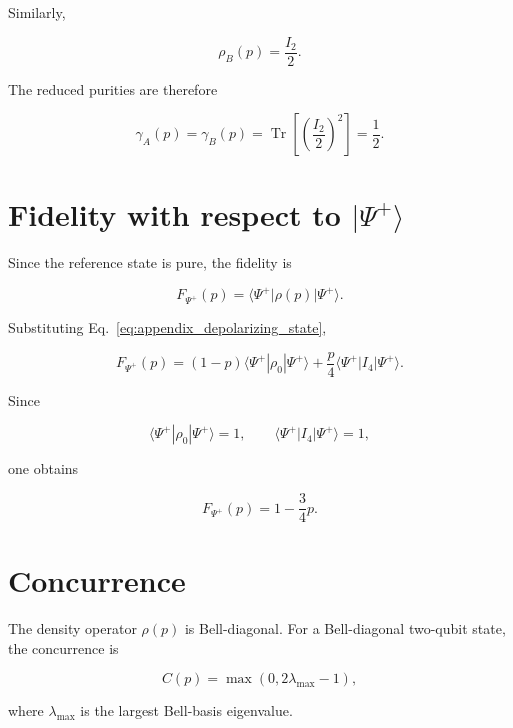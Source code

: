 Similarly,

\[
\rho_B(p)
=
\frac{I_2}{2}.
\]

The reduced purities are therefore

\begin{equation}
\gamma_A(p)
=
\gamma_B(p)
=
\operatorname{Tr}
\left[
\left(
\frac{I_2}{2}
\right)^2
\right]
=
\frac{1}{2}.
\label{eq:appendix_depolarizing_reduced_purity}
\end{equation}


\section*{Fidelity with respect to \texorpdfstring{\( |\Psi^+\rangle \)}{|Psi+>}}

Since the reference state is pure, the fidelity is

\[
F_{\Psi^+}(p)
=
\langle \Psi^+ |
\rho(p)
| \Psi^+ \rangle.
\]

Substituting Eq.~\eqref{eq:appendix_depolarizing_state},

\[
F_{\Psi^+}(p)
=
(1-p)
\langle \Psi^+ |
\rho_0
| \Psi^+ \rangle
+
\frac{p}{4}
\langle \Psi^+ |
I_4
| \Psi^+ \rangle.
\]

Since

\[
\langle \Psi^+ |
\rho_0
| \Psi^+ \rangle
=
1,
\qquad
\langle \Psi^+ |
I_4
| \Psi^+ \rangle
=
1,
\]

one obtains

\begin{equation}
F_{\Psi^+}(p)
=
1
-
\frac{3}{4}p.
\label{eq:appendix_depolarizing_fidelity}
\end{equation}


\section*{Concurrence}

The density operator \( \rho(p) \) is Bell-diagonal. For a Bell-diagonal two-qubit state, the concurrence is

\[
C(p)
=
\max
\left(
0,
2\lambda_{\max}-1
\right),
\]

where \( \lambda_{\max} \) is the largest Bell-basis eigenvalue.

